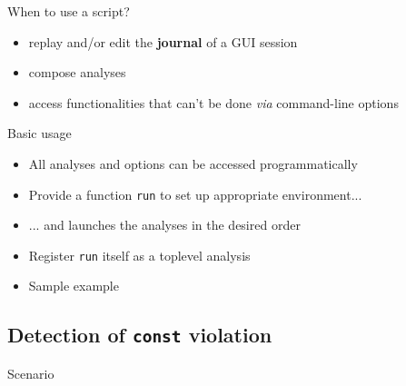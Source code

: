 \begin{frame}{When to use a script?}
\begin{itemize}
\item replay and/or edit the \textbf{journal} of a GUI session
\item compose analyses
\item access functionalities that can't be done {\it via} command-line options
\end{itemize}
\end{frame}

\begin{frame}[fragile]{Basic usage}
\begin{itemize}
\item All analyses and options can be accessed programmatically
\item Provide a function \texttt{run} to set up appropriate environment...
\item ... and launches the analyses in the desired order
\item Register \texttt{run} itself as a toplevel analysis
\item Sample example
\end{itemize}
\end{frame}

\subsection{Detection of \texttt{const} violation}
\begin{frame}{Scenario}
\end{frame}


